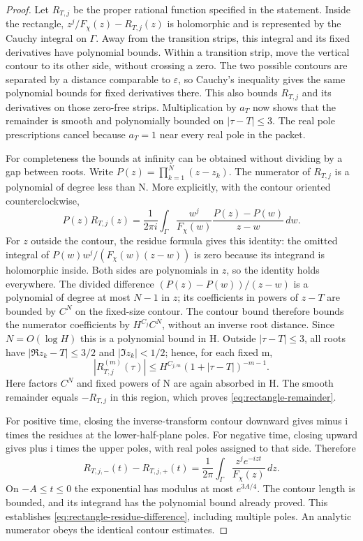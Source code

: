 \begin{proof}
Let $R_{T,j}$ be the proper rational function specified in the
statement.  Inside the rectangle,
$z^j/F_\chi(z)-R_{T,j}(z)$ is holomorphic and is represented by
the Cauchy integral on $\Gamma$.  Away from the transition strips,
this integral and its fixed derivatives have polynomial bounds.
Within a transition strip, move the vertical contour to its other
side, without crossing a zero.  The two possible contours are
separated by a distance comparable to $\varepsilon$, so Cauchy's
inequality gives the same polynomial bounds for fixed derivatives
there.  This also bounds $R_{T,j}$ and its derivatives on those
zero-free strips.  Multiplication by $a_T$ now shows that the
remainder is smooth and polynomially bounded on $|\tau-T|\leq3$.
The real pole prescriptions cancel because $a_T=1$ near every real
pole in the packet.

For completeness the bounds at infinity can be obtained without
dividing by a gap between roots.  Write
$P(z)=\prod_{k=1}^N(z-z_k)$.  The numerator of $R_{T,j}$ is a
polynomial of degree less than N. More explicitly, with the contour
oriented counterclockwise,
\[
 P(z)R_{T,j}(z)=\frac1{2\pi i}\int_\Gamma
 \frac{w^j}{F_\chi(w)}\frac{P(z)-P(w)}{z-w}\,dw.
\]
For $z$ outside the contour, the residue formula gives this identity:
the omitted integral of $P(w)w^j/(F_\chi(w)(z-w))$ is zero because
its integrand is holomorphic inside. Both sides are polynomials in
$z$, so the identity holds everywhere. The divided difference
$(P(z)-P(w))/(z-w)$ is a polynomial of degree at most $N-1$ in
$z$; its coefficients in powers of $z-T$ are bounded by $C^N$
on the fixed-size contour. The contour bound therefore bounds the
numerator coefficients by $H^{C_j}C^N$, without an inverse root
distance. Since $N=O(\log H)$ this is a polynomial bound in H.
Outside $|\tau-T|\leq3$, all roots have
$|\Re z_k-T|\leq3/2$ and $|\Im z_k|<1/2$; hence, for each fixed m,
\[
 |R_{T,j}^{(m)}(\tau)|
 \leq H^{C_{j,m}}(1+|\tau-T|)^{-m-1}.
\]
Here factors $C^N$ and fixed powers of N are again absorbed in H.
The smooth remainder equals $-R_{T,j}$ in this region,
which proves \eqref{eq:rectangle-remainder}.

For positive time, closing the inverse-transform contour downward
gives minus i times the residues at the lower-half-plane poles.
For negative time, closing upward gives plus i times the upper
poles, with real poles assigned to that side.  Therefore
\[
 R_{T,j,-}(t)-R_{T,j,+}(t)
       =\frac1{2\pi}\int_\Gamma
                     \frac{z^j e^{-izt}}{F_\chi(z)}\,dz.
\]
On $-A\leq t\leq0$ the exponential has modulus at most
$e^{3A/4}$.  The contour length is bounded, and its integrand has
the polynomial bound already proved.  This establishes
\eqref{eq:rectangle-residue-difference}, including multiple poles.
An analytic numerator obeys the identical contour estimates.
\end{proof}

